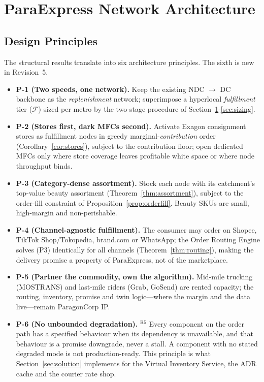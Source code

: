 \section{ParaExpress Network Architecture}\label{sec:arch}

\subsection{Design Principles}
The structural results translate into six architecture principles. The sixth is new in Revision~5.

\begin{itemize}
\item \textbf{P-1 (Two speeds, one network).} Keep the existing NDC $\to$ DC backbone as the \emph{replenishment} network; superimpose a hyperlocal \emph{fulfillment} tier ($\mathcal{F}$) sized per metro by the two-stage procedure of Section~\ref{sec:arch}-\ref{sec:sizing}.
\item \textbf{P-2 (Stores first, dark MFCs second).} Activate Exagon consignment stores as fulfillment nodes in greedy marginal-\emph{contribution} order (Corollary~\ref{cor:stores}), subject to the contribution floor; open dedicated MFCs only where store coverage leaves profitable white space or where node throughput binds.
\item \textbf{P-3 (Category-dense assortment).} Stock each node with its catchment's top-value beauty assortment (Theorem~\ref{thm:assortment}), subject to the order-fill constraint of Proposition~\ref{prop:orderfill}. Beauty SKUs are small, high-margin and non-perishable. 
\item \textbf{P-4 (Channel-agnostic fulfillment).} The consumer may order on Shopee, TikTok Shop/Tokopedia, brand.com or WhatsApp; the Order Routing Engine solves (P3) identically for all channels (Theorem~\ref{thm:routing}), making the delivery promise a property of ParaExpress, not of the marketplace.
\item \textbf{P-5 (Partner the commodity, own the algorithm).} Mid-mile trucking (MOSTRANS) and last-mile riders (Grab, GoSend) are rented capacity; the routing, inventory, promise and twin logic---where the margin and the data live---remain ParagonCorp IP.
\item \textbf{P-6 (No unbounded degradation).} $^{\mathrm{R5}}$ Every component on the order path has a specified behaviour when its dependency is unavailable, and that behaviour is a promise downgrade, never a stall. A component with no stated degraded mode is not production-ready. This principle is what Section~\ref{sec:solution} implements for the Virtual Inventory Service, the ADR cache and the courier rate shop.
\end{itemize}

